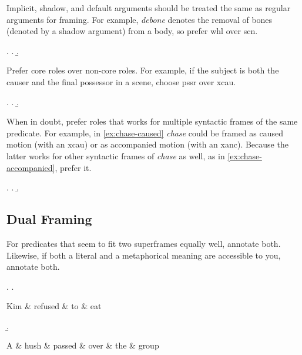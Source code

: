 \documentclass[a4paper]{article}
\begin{document}
Implicit, shadow, and default arguments \citep{di-fabio-etal-2019-verbatlas} should
be treated the same as regular arguments for framing. For example,
\emph{debone} denotes the removal of bones (denoted by a shadow argument) from
a body, so prefer \textsf{whl} over \textsf{scn}.

\ex. \a. 
     \b. 


Prefer core roles over non-core roles. For example, if the subject is both the causer and the final possessor in a scene, choose \textsf{pssr} over \textsf{xcau}.

\ex. \a. 
     \b. 

When in doubt, prefer roles that works for multiple syntactic frames of the
same predicate. For example, in \ref{ex:chase-caused} \emph{chase} could be
framed as caused motion (with an \textsf{xcau}) or as accompanied motion (with
an \textsf{xanc}). Because the latter works for other syntactic frames of
\emph{chase} as well, as in \ref{ex:chase-accompanied}, prefer it.

\ex. \a. \label{ex:chase-caused} 
     \b. \label{ex:chase-accompanied} 

\subsection{Dual Framing}

For predicates that seem to fit two superframes equally well, annotate both. Likewise, if both a literal and a metaphorical meaning are accessible to you, annotate both.

\ex.
\a. \begin{dependency}
    \begin{deptext}
        Kim \& refused \& to \& eat \\
    \end{deptext}
\end{dependency}
\b. \begin{dependency}
    \begin{deptext}
        A \& hush \& passed \& over \& the \& group \\
    \end{deptext}
\end{dependency}
\end{document}
